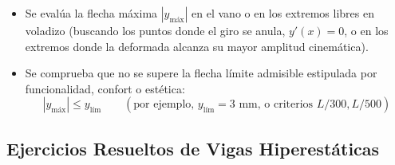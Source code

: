 \begin{enumerate}
\begin{itemize}
              \item Se evalúa la flecha máxima $|y_{\text{máx}}|$ en el vano o en los extremos libres en voladizo (buscando los puntos donde el giro se anula, $y'(x) = 0$, o en los extremos donde la deformada alcanza su mayor amplitud cinemática).
              \item Se comprueba que no se supere la flecha límite admisible estipulada por funcionalidad, confort o estética:
                    \begin{equation}
                        |y_{\text{máx}}| \le y_{\text{lím}} \qquad (\text{por ejemplo, } y_{\text{lím}} = 3\text{ mm, o criterios } L/300, L/500)
                    \end{equation}
          \end{itemize}
\end{enumerate}

\subsection{Ejercicios Resueltos de Vigas Hiperestáticas}

